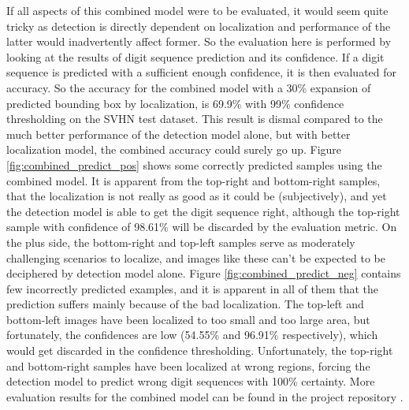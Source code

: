 \documentclass{article}
\begin{document}
	If all aspects of this combined model were to be evaluated, it would seem quite tricky as detection is directly dependent on localization and performance of the latter would inadvertently affect former. So the evaluation here is performed by looking at the results of digit sequence prediction and its confidence. If a digit sequence is predicted with a sufficient enough confidence, it is then evaluated for accuracy. So the accuracy for the combined model with a 30\% expansion of predicted bounding box by localization, is 69.9\% with 99\% confidence thresholding on the SVHN test dataset. This result is dismal compared to the much better performance of the detection model alone, but with better localization model, the combined accuracy could surely go up. Figure \ref{fig:combined_predict_pos} shows some correctly predicted samples using the combined model. It is apparent from the top-right and bottom-right samples, that the localization is not really as good as it could be (subjectively), and yet the detection model is able to get the digit sequence right, although the top-right sample with confidence of 98.61\% will be discarded by the evaluation metric. On the plus side, the bottom-right and top-left samples serve as moderately challenging scenarios to localize, and images like these can't be expected to be deciphered by detection model alone. Figure \ref{fig:combined_predict_neg} contains few incorrectly predicted examples, and it is apparent in all of them that the prediction suffers mainly because of the bad localization. The top-left and bottom-left images have been localized to too small and too large area, but fortunately, the confidences are low (54.55\% and 96.91\% respectively), which would get discarded in the confidence thresholding. Unfortunately, the top-right and bottom-right samples have been localized at wrong regions, forcing the detection model to predict wrong digit sequences with 100\% certainty. More evaluation results for the combined model can be found in the project repository \cite{combined-eval}.
	
\end{document}
